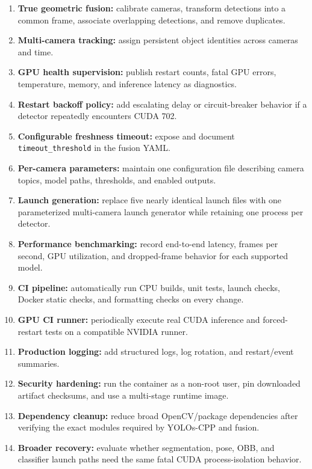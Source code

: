 \documentclass[11pt,a4paper]{article}
\begin{document}
\begin{enumerate}
  \item \textbf{True geometric fusion:} calibrate cameras, transform detections into a common frame, associate overlapping detections, and remove duplicates.
  \item \textbf{Multi-camera tracking:} assign persistent object identities across cameras and time.
  \item \textbf{GPU health supervision:} publish restart counts, fatal GPU errors, temperature, memory, and inference latency as diagnostics.
  \item \textbf{Restart backoff policy:} add escalating delay or circuit-breaker behavior if a detector repeatedly encounters CUDA 702.
  \item \textbf{Configurable freshness timeout:} expose and document \texttt{timeout\_threshold} in the fusion YAML.
  \item \textbf{Per-camera parameters:} maintain one configuration file describing camera topics, model paths, thresholds, and enabled outputs.
  \item \textbf{Launch generation:} replace five nearly identical launch files with one parameterized multi-camera launch generator while retaining one process per detector.
  \item \textbf{Performance benchmarking:} record end-to-end latency, frames per second, GPU utilization, and dropped-frame behavior for each supported model.
  \item \textbf{CI pipeline:} automatically run CPU builds, unit tests, launch checks, Docker static checks, and formatting checks on every change.
  \item \textbf{GPU CI runner:} periodically execute real CUDA inference and forced-restart tests on a compatible NVIDIA runner.
  \item \textbf{Production logging:} add structured logs, log rotation, and restart/event summaries.
  \item \textbf{Security hardening:} run the container as a non-root user, pin downloaded artifact checksums, and use a multi-stage runtime image.
  \item \textbf{Dependency cleanup:} reduce broad OpenCV/package dependencies after verifying the exact modules required by YOLOs-CPP and fusion.
  \item \textbf{Broader recovery:} evaluate whether segmentation, pose, OBB, and classifier launch paths need the same fatal CUDA process-isolation behavior.
\end{enumerate}
\end{document}
